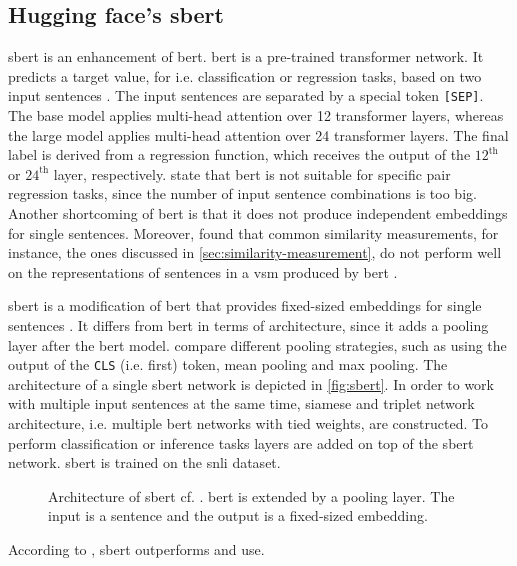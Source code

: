 \subsection{Hugging face's \acs{sbert}}\label{subsec:hf-sent-ransformers}

\ac{sbert} is an enhancement of \ac{bert}.
\ac{bert} is a pre-trained transformer network.
It predicts a target value, for i.e. classification or regression tasks, based on two input sentences \cite{HfsentTrans2019}.
The input sentences are separated by a special token \texttt{[SEP]}.
The base model applies multi-head attention over 12 transformer layers, whereas the large model applies multi-head attention over 24 transformer layers.
The final label is derived from a regression function, which receives the output of the $12^\text{th}$ or $24^\text{th}$ layer, respectively.
\citeauthor{HfsentTrans2019} state that \ac{bert} is not suitable for specific pair regression tasks, 
since the number of input sentence combinations is too big.
Another shortcoming of \ac{bert} is that it does not produce independent embeddings for single sentences.
Moreover, \citeauthor{HfsentTrans2019} found that common similarity measurements, for instance, the ones discussed in \autoref{sec:similarity-measurement}, 
do not perform well on the representations of sentences in a \ac{vsm} produced by \ac{bert} \cite{HfsentTrans2019}.

\ac{sbert} is a modification of \ac{bert} that provides fixed-sized embeddings for single sentences \cite{HfsentTrans2019}.
It differs from \ac{bert} in terms of architecture, since it adds a pooling layer after the \ac{bert} model.
\citeauthor{HfsentTrans2019} compare different pooling strategies, such as using the output of the \texttt{CLS} (i.e. first) token, mean pooling and max pooling.
The architecture of a single \ac{sbert} network is depicted in \autoref{fig:sbert}.
In order to work with multiple input sentences at the same time, siamese and triplet network architecture, 
i.e. multiple \ac{bert} networks with tied weights, are constructed.
To perform classification or inference tasks layers are added on top of the \ac{sbert} network.
\ac{sbert} is trained on the \ac{snli} dataset.

\begin{figure}[htp] %
    \centering
    
    \caption[Architecture of \ac{sbert}]{Architecture of \ac{sbert} cf. \cite{HfsentTrans2019}.
    \ac{bert} is extended by a pooling layer.
    The input is a sentence and the output is a fixed-sized embedding.
    }
    \label{fig:sbert}
\end{figure}

According to \citeauthor{HfsentTrans2019}, \ac{sbert} outperforms \infersent{} and \ac{use}.